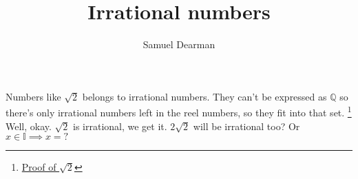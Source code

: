 \documentclass{article}
\title{Irrational numbers}
\author{Samuel Dearman}
\begin{document}
    \maketitle
    Numbers like $\sqrt{2}$ belongs to irrational numbers. They can't be expressed as $\mathbb{Q}$ so there's only irrational numbers left in the reel numbers, so they fit into that set. \footnote{\href{file:///home/uhh/_Documents/existence/Existence/lang/set_theory/number_sets/real_numbers/irrational_numbers/proofs/proof_of_sqrt2.pdf}{Proof of $\sqrt{2}$}} 
    Well, okay. $\sqrt{2}$ is irrational, we get it. $2\sqrt{2}$ will be irrational too? Or $x \in \mathbb{I} \implies x = ?$
\end{document}
